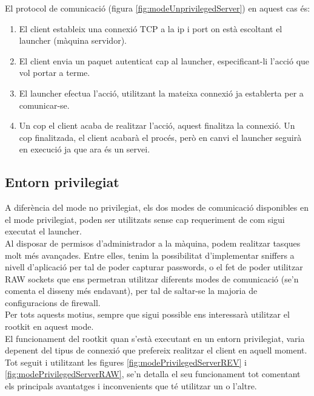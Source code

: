 El protocol de comunicació (figura \ref{fig:modeUnprivilegedServer}) en aquest cas és: \\

\begin{enumerate}
    \item El client estableix una connexió TCP a la ip i port on està escoltant el launcher (màquina servidor).
    \item El client envia un paquet autenticat cap al launcher, especificant-li l'acció que vol portar a terme.
    \item El launcher efectua l'acció, utilitzant la mateixa connexió ja establerta per a comunicar-se.
    \item Un cop el client acaba de realitzar l'acció, aquest finalitza la connexió. Un cop finalitzada, el client acabarà el 
        procés, però en canvi el launcher seguirà en execució ja que ara és un servei.
\end{enumerate}

\subsection{Entorn privilegiat} \label{sec:disseny_mode_privilegiat}

A diferència del mode no privilegiat, els dos modes de comunicació disponibles en el mode privilegiat, poden ser 
utilitzats sense cap requeriment de com sigui executat el launcher. \\

Al disposar de permisos d'administrador a
la màquina, podem realitzar tasques molt més avançades. Entre elles, tenim la possibilitat d'implementar 
sniffers a nivell d'aplicació per tal de poder capturar passwords, o el fet de poder utilitzar RAW sockets que
ens permetran utilitzar diferents modes de comunicació (se'n comenta el disseny més endavant), per tal de 
saltar-se la majoria de configuracions de firewall. \\

Per tots aquests motius, sempre que sigui possible ens interessarà utilitzar el rootkit en aquest mode. \\

El funcionament del rootkit quan s'està executant en un entorn privilegiat, varia depenent del tipus de connexió
que prefereix realitzar el client en aquell moment. Tot seguit i utilitzant les figures \ref{fig:modePrivilegedServerREV} i 
\ref{fig:modePrivilegedServerRAW}, se'n detalla el seu funcionament tot comentant els principals avantatges
i inconvenients que té utilitzar un o l'altre. \\

